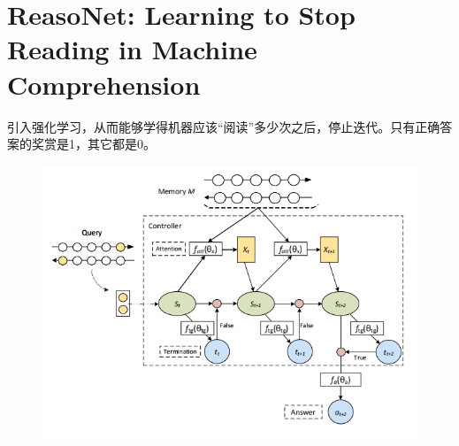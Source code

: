 \documentclass[a4paper,UTF8]{article}
\numberwithin{equation}{section}
\begin{document}
\newpage
\section{ReasoNet: Learning to Stop Reading in Machine Comprehension}
引入强化学习，从而能够学得机器应该“阅读”多少次之后，停止迭代。只有正确答案的奖赏是1，其它都是0。
\begin{figure}[H]
	\centering
	\includegraphics[width=\textwidth]{4-1.png}
\end{figure}

\newpage
\end{document}
